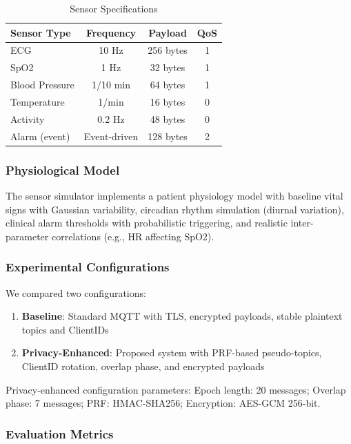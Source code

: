 \documentclass[conference]{IEEEtran}
\begin{document}
\begin{table}[htbp]
\caption{Sensor Specifications}
\label{tab:sensors}
\centering
\begin{tabular}{lccc}
\toprule
\textbf{Sensor Type} & \textbf{Frequency} & \textbf{Payload} & \textbf{QoS} \\
\midrule
ECG & 10 Hz & 256 bytes & 1 \\
SpO2 & 1 Hz & 32 bytes & 1 \\
Blood Pressure & 1/10 min & 64 bytes & 1 \\
Temperature & 1/min & 16 bytes & 0 \\
Activity & 0.2 Hz & 48 bytes & 0 \\
Alarm (event) & Event-driven & 128 bytes & 2 \\
\bottomrule
\end{tabular}
\end{table}

\subsubsection{Physiological Model}

The sensor simulator implements a patient physiology model with baseline vital signs with Gaussian variability, circadian rhythm simulation (diurnal variation), clinical alarm thresholds with probabilistic triggering, and realistic inter-parameter correlations (e.g., HR affecting SpO2).

\subsubsection{Experimental Configurations}

We compared two configurations:

\begin{enumerate}
    \item \textbf{Baseline}: Standard MQTT with TLS, encrypted payloads, stable plaintext topics and ClientIDs
    \item \textbf{Privacy-Enhanced}: Proposed system with PRF-based pseudo-topics, ClientID rotation, overlap phase, and encrypted payloads
\end{enumerate}

Privacy-enhanced configuration parameters: Epoch length: 20 messages; Overlap phase: 7 messages; PRF: HMAC-SHA256; Encryption: AES-GCM 256-bit.

\subsubsection{Evaluation Metrics}
\end{document}
